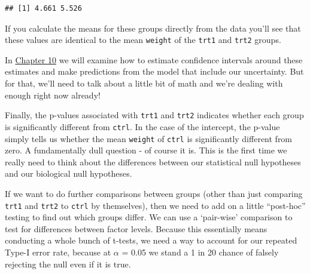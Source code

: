 \documentclass[
]{book}
\newenvironment{Shaded}{\begin{snugshade}}{\end{snugshade}}
\newcommand{\CommentTok}[1]{\textcolor[rgb]{0.56,0.35,0.01}{\textit{#1}}}
\newcommand{\DecValTok}[1]{\textcolor[rgb]{0.00,0.00,0.81}{#1}}
\newcommand{\KeywordTok}[1]{\textcolor[rgb]{0.13,0.29,0.53}{\textbf{#1}}}
\newcommand{\NormalTok}[1]{#1}
\newcommand{\OperatorTok}[1]{\textcolor[rgb]{0.81,0.36,0.00}{\textbf{#1}}}
\newcommand{\StringTok}[1]{\textcolor[rgb]{0.31,0.60,0.02}{#1}}
\begin{document}
\begin{Shaded}
\end{Shaded}

\begin{verbatim}
## [1] 4.661 5.526
\end{verbatim}

If you calculate the means for these groups directly from the data you'll see that these values are identical to the mean \texttt{weight} of the \texttt{trt1} and \texttt{trt2} groups.

In \protect\hyperlink{Chapter10}{Chapter 10} we will examine how to estimate confidence intervals around these estimates and make predictions from the model that include our uncertainty. But for that, we'll need to talk about a little bit of math and we're dealing with enough right now already!

Finally, the p-values associated with \texttt{trt1} and \texttt{trt2} indicates whether each group is significantly different from \texttt{ctrl}. In the case of the intercept, the p-value simply tells us whether the mean \texttt{weight} of \texttt{ctrl} is significantly different from zero. A fundamentally dull question - of course it is. This is the first time we really need to think about the differences between our statistical null hypotheses and our biological null hypotheses.

If we want to do further comparisons between groups (other than just comparing \texttt{trt1} and \texttt{trt2} to \texttt{ctrl} by themselves), then we need to add on a little ``post-hoc'' testing to find out which groups differ. We can use a `pair-wise' comparison to test for differences between factor levels. Because this essentially means conducting a whole bunch of t-tests, we need a way to account for our repeated Type-I error rate, because at \(\alpha\) = 0.05 we stand a 1 in 20 chance of falsely rejecting the null even if it is true.
\end{document}
